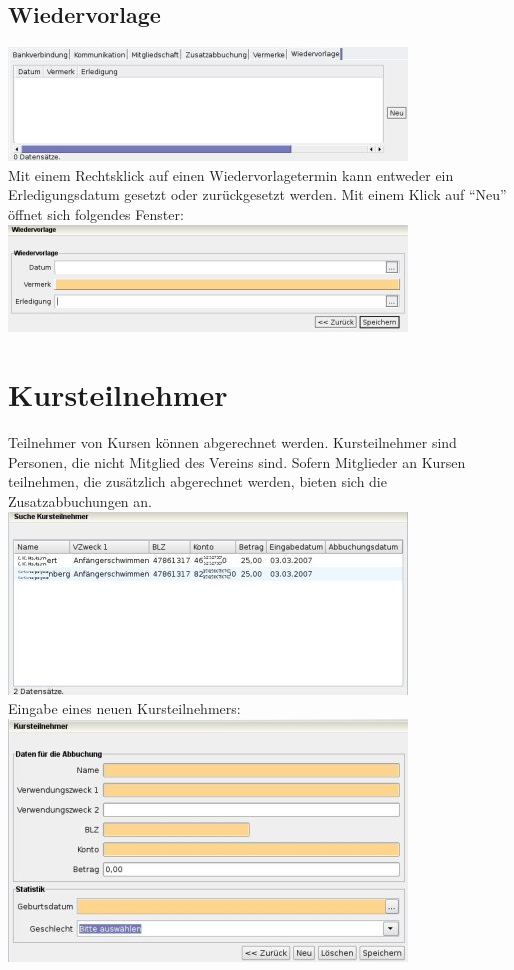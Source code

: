 \documentclass[a4paper,BCOR30mm,DIV14,pdftex,liststotoc,footsepline,openany]{scrbook}
\begin{document}
\section{Wiedervorlage}
\includegraphics{./screenshots/mitgliedwiedervorlage.jpg}\\
Mit einem Rechtsklick auf einen Wiedervorlagetermin kann entweder ein Erledigungsdatum gesetzt oder zurückgesetzt werden. Mit einem Klick auf ``Neu'' öffnet sich folgendes Fenster:\\
\includegraphics{./screenshots/wiedervorlage.jpg}\\

\chapter{Kursteilnehmer}
Teilnehmer von Kursen können abgerechnet werden. Kursteilnehmer sind Personen, die nicht Mitglied des Vereins sind. 
Sofern Mitglieder an Kursen teilnehmen, die zusätzlich abgerechnet werden, bieten sich die Zusatzabbuchungen  an.\\
\includegraphics{./screenshots/kursteilnehmersuche.jpg}\\
Eingabe eines neuen Kursteilnehmers:\\
\includegraphics{./screenshots/kursteilnehmer.jpg}\\
\end{document}
